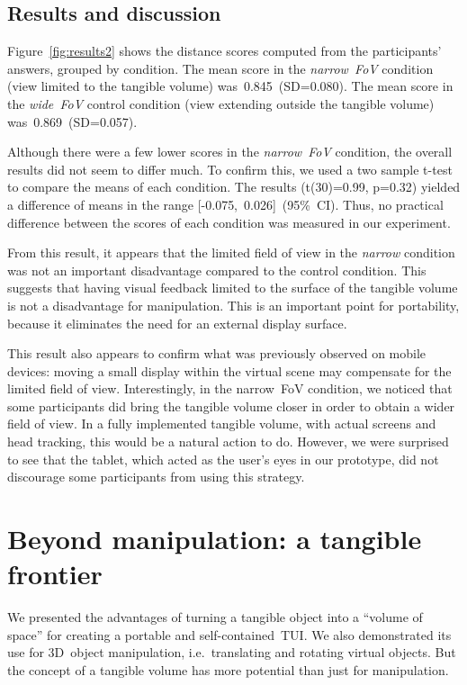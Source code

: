 \documentclass{vgtc}                         \havecopyrightspacefalse
\begin{document}
\subsection{Results and discussion}

Figure~\ref{fig:results2} shows the distance scores computed from the participants' answers, grouped by condition. The mean score in the \emph{narrow~FoV} condition (view limited to the tangible volume) was~0.845~(SD=0.080). The mean score in the \emph{wide~FoV} control condition (view extending outside the tangible volume) was~0.869~(SD=0.057).

Although there were a few lower scores in the \emph{narrow~FoV} condition, the overall results did not seem to differ much. To confirm this, we used a two sample t-test to compare the means of each condition. The results (t(30)=0.99, p=0.32) yielded a difference of means in the range [-0.075,~0.026]~(95\%~CI). Thus, no practical difference between the scores of each condition was measured in our experiment.

From this result, it appears that the limited field of view in the \emph{narrow} condition was not an important disadvantage compared to the control condition. This suggests that having visual feedback limited to the surface of the tangible volume is not a disadvantage for manipulation. This is an important point for portability, because it eliminates the need for an external display surface.

This result also appears to confirm what was previously observed on mobile devices: moving a small display within the virtual scene may compensate for the limited field of view. Interestingly, in the narrow~FoV condition, we noticed that some participants did bring the tangible volume closer in order to obtain a wider field of view. In a fully implemented tangible volume, with actual screens and head tracking, this would be a natural action to do. However, we were surprised to see that the tablet, which acted as the user's eyes in our prototype, did not discourage some participants from using this strategy.

\section{Beyond manipulation: a tangible frontier}

We presented the advantages of turning a tangible object into a ``volume of space'' for creating a portable and self-contained~TUI. We also demonstrated its use for 3D~object manipulation, i.e.~translating and rotating virtual objects. But the concept of a tangible volume has more potential than just for manipulation.
\end{document}
